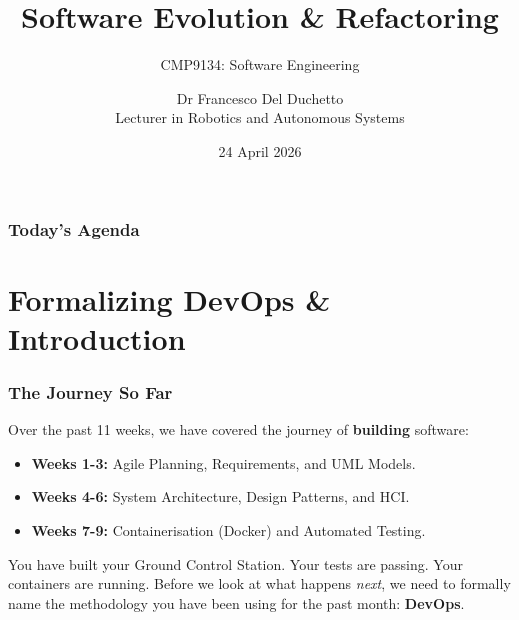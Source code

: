 \documentclass[xcolor=table]{beamer}
\title[CMP9134 - Week 12]{Software Evolution \& Refactoring}
\subtitle{CMP9134: Software Engineering}
\author[Francesco Del Duchetto]{Dr Francesco Del Duchetto\\Lecturer in Robotics and Autonomous Systems}
\institute[University of Lincoln]{University of Lincoln}
\date{24 April 2026}
\begin{document}
\begin{frame}
    \titlepage
\end{frame}

\begin{frame}
    \frametitle{Today's Agenda}
    \tableofcontents
\end{frame}



\section{Formalizing DevOps \& Introduction}

\begin{frame}
    \frametitle{The Journey So Far}
    Over the past 11 weeks, we have covered the journey of \textbf{building} software:
    
    \begin{itemize}
        \item \textbf{Weeks 1-3:} Agile Planning, Requirements, and UML Models.
        \item \textbf{Weeks 4-6:} System Architecture, Design Patterns, and HCI.
        \item \textbf{Weeks 7-9:} Containerisation (Docker) and Automated Testing.
    \end{itemize}
    
    \vspace{0.3cm}
    You have built your Ground Control Station. Your tests are passing. Your containers are running. Before we look at what happens \textit{next}, we need to formally name the methodology you have been using for the past month: \textbf{DevOps}.
\end{frame}
\end{document}
